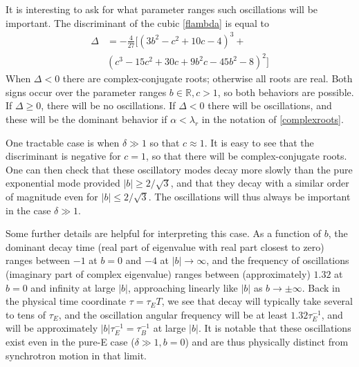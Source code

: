 \documentclass[amsmath,amssymb,nofootinbib,notitlepage,superscriptaddress,twocolumn]{revtex4-2}
\begin{document}
It is interesting to ask for what parameter ranges such oscillations will be important.  The discriminant of the cubic \eqref{flambda} is equal to 
\begin{align}
    \Delta &= -\frac{4}{27}[(3b^2-c^2+10c-4)^3+\\
    &(c^3-15c^2+30c+9b^2c-45b^2-8)^2 ]
\end{align}
When $\Delta < 0$ there are complex-conjugate roots; otherwise all roots are real.  Both signs occur over the parameter ranges $b\in \mathbb{R}, c>1$, so both behaviors are possible.  If $\Delta \geq 0$, there will be no oscillations.  If $\Delta < 0$ there will be oscillations, and these will be the dominant behavior if $\alpha < \lambda_r$ in the notation of \eqref{complexroots}.

One tractable case is when $\delta \gg 1$ so that $c \approx 1$.  It is easy to see that the discriminant is negative for $c=1$, so that there will be complex-conjugate roots.  One can then check that these oscillatory modes decay more slowly than the pure exponential mode provided $|b| \geq 2/\sqrt{3}$, and that they decay with a similar order of magnitude even for $|b| \leq 2/\sqrt{3}$.  The oscillations will thus always be important in the case $\delta \gg 1$.  

Some further details are helpful for interpreting this case. As a function of $b$, the dominant decay time (real part of eigenvalue with real part closest to zero) ranges between $-1$ at $b=0$ and $-4$ at $|b| \to \infty$, and the frequency of oscillations (imaginary part of complex eigenvalue) ranges between (approximately) $1.32$ at $b=0$ and infinity at large $|b|$, approaching linearly like $|b|$ as $b \to \pm\infty$.  Back in the physical time coordinate $\tau= \tau_E T$, we see that decay will typically take several to tens of $\tau_E$, and the oscillation angular frequency will be at least $1.32 \tau_E^{-1}$, and will be approximately $|b|\tau_E^{-1}=\tau_B^{-1}$ at large $|b|$.  It is notable that these oscillations exist even in the pure-E case ($\delta \gg 1, b=0$) and are thus physically distinct from synchrotron motion in that limit.
\end{document}
